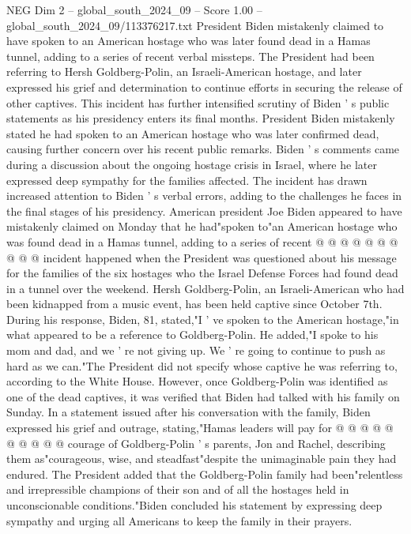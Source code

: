 \begin{textsample}{NEG Dim 2 – global\_south\_2024\_09 – Score 1.00 – global\_south\_2024\_09/113376217.txt}  \label{ex:f2_neg_408}
President Biden mistakenly claimed to have spoken to an American hostage who was later found dead in a Hamas tunnel, adding to a series of recent verbal missteps.
The President had been referring to Hersh Goldberg-Polin, an Israeli-American hostage, and later expressed his grief and determination to continue efforts in securing the release of other captives.
This incident has further intensified scrutiny of Biden ' s public statements as his presidency enters its final months.
President Biden mistakenly stated he had spoken to an American hostage who was later confirmed dead, causing further concern over his recent public remarks.
Biden ' s comments came during a discussion about the ongoing hostage crisis in Israel, where he later expressed deep sympathy for the families affected.
The incident has drawn increased attention to Biden ' s verbal errors, adding to the challenges he faces in the final stages of his presidency.
American president Joe Biden appeared to have mistakenly claimed on Monday that he had"spoken to"an American hostage who was found dead in a Hamas tunnel, adding to a series of recent @ @ @ @ @ @ @ @ @ @ incident happened when the President was questioned about his message for the families of the six hostages who the Israel Defense Forces had found dead in a tunnel over the weekend.
Hersh Goldberg-Polin, an Israeli-American who had been kidnapped from a music event, has been held captive since October 7th.
During his response, Biden, 81, stated,"I ' ve spoken to the American hostage,"in what appeared to be a reference to Goldberg-Polin.
He added,"I spoke to his mom and dad, and we ' re not giving up.
We ' re going to continue to push as hard as we can."The President did not specify whose captive he was referring to, according to the White House.
However, once Goldberg-Polin was identified as one of the dead captives, it was verified that Biden had talked with his family on Sunday.
In a statement issued after his conversation with the family, Biden expressed his grief and outrage, stating,"Hamas leaders will pay for @ @ @ @ @ @ @ @ @ @ courage of Goldberg-Polin ' s parents, Jon and Rachel, describing them as"courageous, wise, and steadfast"despite the unimaginable pain they had endured.
The President added that the Goldberg-Polin family had been"relentless and irrepressible champions of their son and of all the hostages held in unconscionable conditions."Biden concluded his statement by expressing deep sympathy and urging all Americans to keep the family in their prayers.

\end{textsample}
